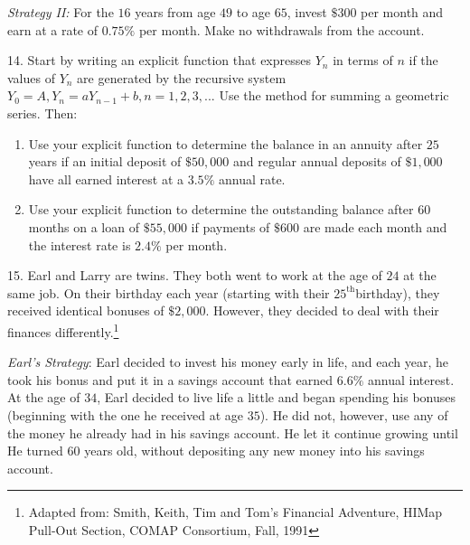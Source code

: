 \documentclass[10pt,]{book}
\theoremstyle{plain}
\theoremstyle{definition}
\theoremstyle{definition}
\theoremstyle{definition}
\numberwithin{equation}{section}
\begin{document}
\begin{exerciselist}
\par
\hypertarget{p-187}{}%
\emph{Strategy II:} For the \(16\) years from age \(49\) to age \(65\), invest \(\$300\) per month and earn at a rate of \(0.75\%\) per month. Make no withdrawals from the account.%
\par\smallskip
\item[14.]\hypertarget{exercise-45}{}\hypertarget{p-188}{}%
Start by writing an explicit function that expresses \(Y_n\) in terms of \(n\) if the values of \(Y_n\) are generated by the recursive system \(Y_0=A, Y_n=aY_{n-1}+b, n = 1, 2, 3, ...\) Use the method for summing a geometric series. Then:%
\leavevmode%
\begin{enumerate}[label=(\alph*)]
\item\hypertarget{li-97}{}Use your explicit function to determine the balance in an annuity after \(25\) years if an initial deposit of \(\$50,000\) and regular annual deposits of \(\$1,000\) have all earned interest at a \(3.5\%\) annual rate.%
\item\hypertarget{li-98}{}Use your explicit function to determine the outstanding balance after \(60\) months on a loan of \(\$55,000\) if payments of \(\$600\) are made each month and the interest rate is \(2.4\%\) per month.%
\end{enumerate}
\par\smallskip
\item[15.]\hypertarget{exercise-46}{}\hypertarget{p-189}{}%
Earl and Larry are twins.  They both went to work at the age of \(24\) at the same job.  On their birthday each year (starting with their \(25^{\text{th}}\)birthday), they received identical bonuses of \(\$2,000\).  However, they decided to deal with their finances differently.\footnote{Adapted from: Smith, Keith, Tim and Tom's Financial Adventure, HIMap Pull-Out Section, COMAP Consortium, Fall, 1991\label{fn-3}}%
\par
\hypertarget{p-190}{}%
%
\par
\hypertarget{p-191}{}%
\emph{Earl's Strategy}: Earl decided to invest his money early in life, and each year, he took his bonus and put it in a savings account that earned \(6.6\%\) annual interest.  At the age of \(34\), Earl decided to live life a little and began spending his bonuses (beginning with the one he received at age \(35\)).  He did not, however, use any of the money he already had in his savings account.  He let it continue growing until He turned \(60\) years old, without depositing any new money into his savings account.%
\par

\end{exerciselist}
\end{document}
